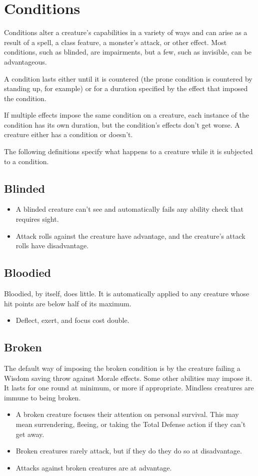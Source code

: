 \section{Conditions}
\label{sec:conditions}
Conditions alter a creature's capabilities in a variety of ways and can arise as a result of a spell, a class feature, a monster's attack, or other effect. Most conditions, such as blinded, are impairments, but a few, such as invisible, can be advantageous.

A condition lasts either until it is countered (the prone condition is countered by standing up, for example) or for a duration specified by the effect that imposed the condition.

If multiple effects impose the same condition on a creature, each instance of the condition has its own duration, but the condition's effects don't get worse. A creature either has a condition or doesn't.

The following definitions specify what happens to a creature while it is subjected to a condition.

\subsection{Blinded\label{condition:blinded}}
\begin{itemize}
    \item A blinded creature can't see and automatically fails any ability check that requires sight.
    \item Attack rolls against the creature have advantage, and the creature's attack rolls have disadvantage.
\end{itemize}

\subsection{Bloodied\label{condition:bloodied}}
Bloodied, by itself, does little. It is automatically applied to any creature whose hit points are below half of its maximum.
\begin{itemize}
    \item  Deflect, exert, and focus cost double.
\end{itemize}

\subsection{Broken\label{condition:broken}}
The default way of imposing the broken condition is by the creature failing a Wisdom saving throw against Morale effects. Some other abilities may impose it. It lasts for one round at minimum, or more if appropriate. Mindless creatures are immune to being broken.
\begin{itemize}
	\item A broken creature focuses their attention on personal survival. This may mean surrendering, fleeing, or taking the Total Defense action if they can't get away.
	\item Broken creatures rarely attack, but if they do they do so at disadvantage.
	\item Attacks against broken creatures are at advantage.
\end{itemize}


